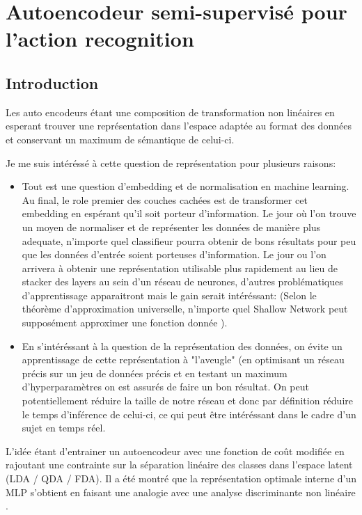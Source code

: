 \section{Autoencodeur semi-supervisé pour l'action recognition}

\subsection{Introduction}
Les auto encodeurs étant une composition de transformation non linéaires en esperant trouver une représentation dans l'espace adaptée au format des données et conservant un maximum de sémantique de celui-ci.

Je me suis intéréssé à cette question de représentation pour plusieurs raisons:
\begin{itemize}
    \item Tout est une question d'embedding et de normalisation en machine learning. Au final, le role premier des couches cachées est de transformer cet embedding en espérant qu'il soit porteur d'information. Le jour où l'on trouve un moyen de normaliser et de représenter les données de manière plus adequate, n'importe quel classifieur pourra obtenir de bons résultats pour peu que les données d'entrée soient porteuses d'information. Le jour ou l'on arrivera à obtenir une représentation utilisable plus rapidement au lieu de stacker des layers au sein d'un réseau de neurones, d'autres problématiques d'apprentissage apparaitront mais le gain serait intéréssant: (Selon le théorème d'approximation universelle, n'importe quel Shallow Network peut supposément approximer une fonction donnée \cite{universalapproxtheorm,scarselli1998universal}).
    
    \item En s'intéréssant à la question de la représentation des données, on évite un apprentissage de cette représentation à "l'aveugle" (en optimisant un réseau précis sur un jeu de données précis et en testant un maximum d'hyperparamètres on est assurés de faire un bon résultat.  On peut potentiellement réduire la taille de notre réseau et donc par définition réduire le temps d'inférence de celui-ci, ce qui peut être intéréssant dans le cadre d'un sujet en temps réel.
\end{itemize}

L'idée étant d'entrainer un autoencodeur avec une fonction de coût modifiée en rajoutant une contrainte sur la séparation linéaire des classes dans l'espace latent (LDA / QDA / FDA). Il a été montré que la représentation optimale interne d'un MLP s'obtient en faisant une analogie avec une analyse discriminante non linéaire \cite{webb1990optimised}.

